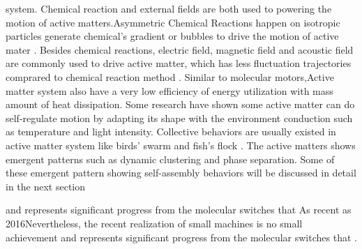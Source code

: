  system.\cite{nikolov2016computational} Chemical reaction and external fields are both used to powering the motion of active matters.Asymmetric Chemical Reactions happen on isotropic particles generate chemical's gradient or bubbles to drive the motion of active mater \cite{shklyaev2016harnessing,zhang2018tailoring,parmar2018micro}. Besides chemical reactions, electric field, magnetic field and acoustic field are commonly used  to drive active matter, which has less fluctuation trajectories comprared to chemical reaction method \cite{han2018engineering,ren2018two}. Similar to molecular motors,Active matter system also have a very low efficiency of energy utilization with mass amount of heat dissipation.\cite{wang2013understanding} Some research have shown some active matter can do self-regulate motion by adapting its shape with the environment conduction such as temperature and light intensity.\cite{tu2017self,li2018light} Collective behaviors are usually existed in active matter system like birds' swarm and fish's flock \cite{wang2015one}. The active matters shows emergent patterns such as dynamic clustering and phase separation.\cite{ginot2018aggregation} Some of these emergent pattern showing self-assembly behaviors will be discussed in detail in the next section 
 
   and represents significant progress from the molecular switches that As recent as 2016Nevertheless, the recent realization of small machines is no small achievement and represents significant progress from the molecular switches that .



